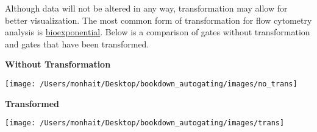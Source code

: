 \documentclass[]{book}
\begin{document}
Although data will not be altered in any way, transformation may allow for better visualization. The most common form of transformation for flow cytometry analysis is \href{http://docs.flowjo.com/vx/graphs-and-gating/gw-transform-overview/}{bioexponential}. Below is a comparison of gates without transformation and gates that have been transformed.

\textbf{Without Transformation}

\texttt{[image: /Users/monhait/Desktop/bookdown\_autogating/images/no\_trans]}

\textbf{Transformed}

\texttt{[image: /Users/monhait/Desktop/bookdown\_autogating/images/trans]}
\end{document}
